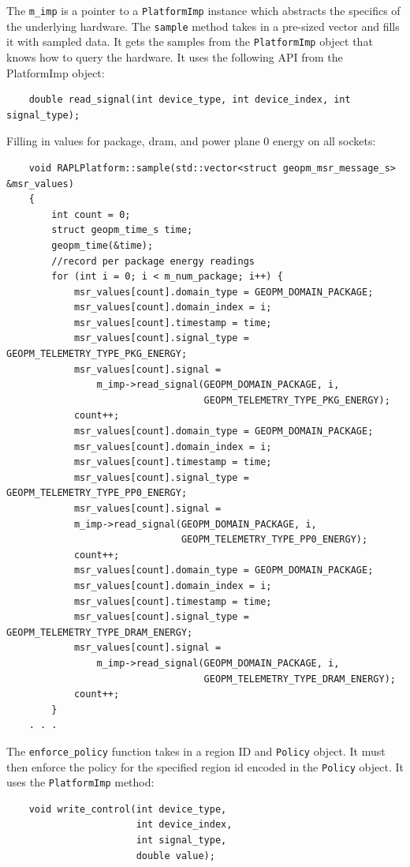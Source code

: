 \documentclass[11pt]{article}
\begin{document}
The \verb#m_imp# is a pointer to a \verb#PlatformImp# instance which
abstracts the specifics of the underlying hardware.  The \verb#sample#
method takes in a pre-sized vector and fills it with sampled data. It
gets the samples from the \verb#PlatformImp# object that knows how to
query the hardware. It uses the following API from the PlatformImp
object:
\begin{verbatim}
    double read_signal(int device_type, int device_index, int signal_type);
\end{verbatim}
Filling in values for package, dram, and power plane 0 energy on all
sockets:
\begin{verbatim}
    void RAPLPlatform::sample(std::vector<struct geopm_msr_message_s> &msr_values)
    {
        int count = 0;
        struct geopm_time_s time;
        geopm_time(&time);
        //record per package energy readings
        for (int i = 0; i < m_num_package; i++) {
            msr_values[count].domain_type = GEOPM_DOMAIN_PACKAGE;
            msr_values[count].domain_index = i;
            msr_values[count].timestamp = time;
            msr_values[count].signal_type = GEOPM_TELEMETRY_TYPE_PKG_ENERGY;
            msr_values[count].signal =
                m_imp->read_signal(GEOPM_DOMAIN_PACKAGE, i,
                                   GEOPM_TELEMETRY_TYPE_PKG_ENERGY);
            count++;
            msr_values[count].domain_type = GEOPM_DOMAIN_PACKAGE;
            msr_values[count].domain_index = i;
            msr_values[count].timestamp = time;
            msr_values[count].signal_type = GEOPM_TELEMETRY_TYPE_PP0_ENERGY;
            msr_values[count].signal =
            m_imp->read_signal(GEOPM_DOMAIN_PACKAGE, i,
                               GEOPM_TELEMETRY_TYPE_PP0_ENERGY);
            count++;
            msr_values[count].domain_type = GEOPM_DOMAIN_PACKAGE;
            msr_values[count].domain_index = i;
            msr_values[count].timestamp = time;
            msr_values[count].signal_type = GEOPM_TELEMETRY_TYPE_DRAM_ENERGY;
            msr_values[count].signal =
                m_imp->read_signal(GEOPM_DOMAIN_PACKAGE, i,
                                   GEOPM_TELEMETRY_TYPE_DRAM_ENERGY);
            count++;
        }
    . . .
\end{verbatim}
The \verb#enforce_policy# function takes in a region ID and
\verb#Policy# object. It must then enforce the policy for the
specified region id encoded in the \verb#Policy# object. It uses the
\verb#PlatformImp# method:
\begin{verbatim}
    void write_control(int device_type,
                       int device_index,
                       int signal_type,
                       double value);
\end{verbatim}
\end{document}
